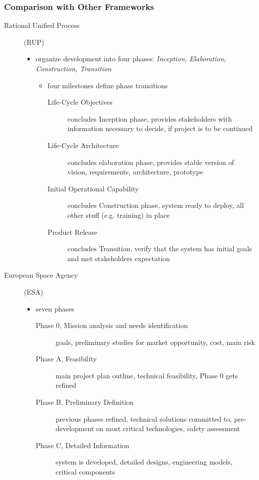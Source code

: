 \documentclass[a4paper, 10pt]{article}
\begin{document}
\subsubsection*{Comparison with Other Frameworks}
\begin{description}
    \item[Rational Unified Process] (RUP)
    \begin{itemize}
        \item organize development into four phases: \emph{Inception, Elaboration, Construction, Transition}
        \begin{itemize}
            \item four milestones define phase transitions
            \begin{description}
                \item[Life-Cycle Objectives] concludes Inception phase, provides stakeholders with information necessary to decide, if project is to be continued
                \item[Life-Cycle Architecture] concludes elaboration phase, provides stable version of vision, requirements, architecture, prototype
                \item[Initial Operational Capability] concludes Construction phase, system ready to deploy, all other stuff (e.g. training) in place
                \item[Product Release] concludes Transition, verify that the system has initial goals and met stakeholders expectation
            \end{description}
        \end{itemize}
    \end{itemize}
    \item[European Space Agency] (ESA)
    \begin{itemize}
        \item seven phases
        \begin{description}
            \item[Phase 0, Mission analysis and needs identification] goals, preliminary studies for market opportunity, cost, main risk
            \item[Phase A, Feasibility] main project plan outline, technical feasibility, Phase 0 gets refined
            \item[Phase B, Preliminary Definition] previous phases refined, technical solutions committed to, pre-development on most critical technologies, safety assessment
            \item[Phase C, Detailed Information] system is developed, detailed designs, engineering models, critical components

\end{description}
\end{itemize}
\end{description}
\end{document}

